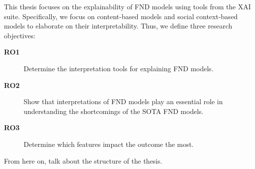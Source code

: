 This thesis focuses on the explainability of FND models using tools from the XAI suite. Specifically, we focus on content-based models and social context-based models to elaborate on their interpretability. Thus, we define three research objectives:
\begin{description}
    \item[\textbf{RO1}] Determine the interpretation tools for explaining FND models.
    \item[\textbf{RO2}] Show that interpretations of FND models play an essential role in understanding the shortcomings of the SOTA FND models.
    \item[\textbf{RO3}] Determine which features impact the outcome the most.
\end{description}
From here on, talk about the structure of the thesis.









